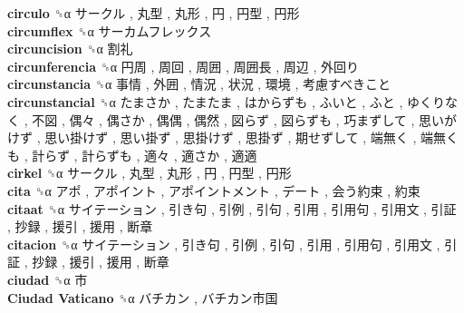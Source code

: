 \textbf{circulo} ␝α   サークル ,  丸型 ,  丸形 ,  円 ,  円型 ,  円形   \\
\textbf{circumflex} ␝α   サーカムフレックス   \\
\textbf{circuncision} ␝α   割礼   \\
\textbf{circunferencia} ␝α   円周 ,  周回 ,  周囲 ,  周囲長 ,  周辺 ,  外回り   \\
\textbf{circunstancia} ␝α   事情 ,  外囲 ,  情況 ,  状況 ,  環境 ,  考慮すべきこと   \\
\textbf{circunstancial} ␝α   たまさか ,  たまたま ,  はからずも ,  ふいと ,  ふと ,  ゆくりなく ,  不図 ,  偶々 ,  偶さか ,  偶偶 ,  偶然 ,  図らず ,  図らずも ,  巧まずして ,  思いがけず ,  思い掛けず ,  思い掛ず ,  思掛けず ,  思掛ず ,  期せずして ,  端無く ,  端無くも ,  計らず ,  計らずも ,  適々 ,  適さか ,  適適   \\
\textbf{cirkel} ␝α   サークル ,  丸型 ,  丸形 ,  円 ,  円型 ,  円形   \\
\textbf{cita} ␝α   アポ ,  アポイント ,  アポイントメント ,  デート ,  会う約束 ,  約束   \\
\textbf{citaat} ␝α   サイテーション ,  引き句 ,  引例 ,  引句 ,  引用 ,  引用句 ,  引用文 ,  引証 ,  抄録 ,  援引 ,  援用 ,  断章   \\
\textbf{citacion} ␝α   サイテーション ,  引き句 ,  引例 ,  引句 ,  引用 ,  引用句 ,  引用文 ,  引証 ,  抄録 ,  援引 ,  援用 ,  断章   \\
\textbf{ciudad} ␝α   市   \\
\textbf{Ciudad Vaticano} ␝α   バチカン ,  バチカン市国   \\
